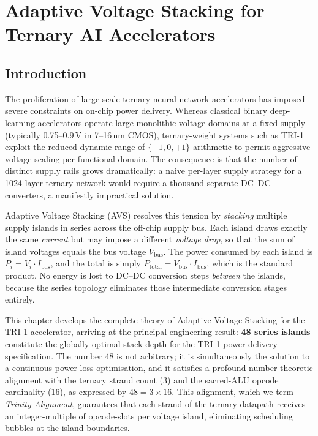 %

\chapter{Adaptive Voltage Stacking for Ternary AI Accelerators}
\label{ch:avs}

\section{Introduction}
\label{sec:avs_intro}

The proliferation of large-scale ternary neural-network accelerators
has imposed severe constraints on on-chip power delivery.  Whereas
classical binary deep-learning accelerators operate large monolithic
voltage domains at a fixed supply (typically 0.75--0.9\,V in 7--16\,nm
CMOS), ternary-weight systems such as TRI-1 exploit the reduced dynamic
range of $\{-1, 0, +1\}$ arithmetic to permit aggressive voltage scaling
per functional domain.  The consequence is that the number of distinct
supply rails grows dramatically: a naive per-layer supply strategy for a
1024-layer ternary network would require a thousand separate DC--DC
converters, a manifestly impractical solution.

Adaptive Voltage Stacking (AVS) resolves this tension by \emph{stacking}
multiple supply islands in series across the off-chip supply bus.  Each
island draws exactly the same \emph{current} but may impose a different
\emph{voltage drop}, so that the sum of island voltages equals the bus
voltage \(V_{\mathrm{bus}}\).  The power consumed by each island is
\(P_i = V_i \cdot I_{\mathrm{bus}}\), and the total is simply
\(P_{\mathrm{total}} = V_{\mathrm{bus}} \cdot I_{\mathrm{bus}}\), which
is the standard product.  No energy is lost to DC--DC conversion steps
\emph{between} the islands, because the series topology eliminates those
intermediate conversion stages entirely.

This chapter develops the complete theory of Adaptive Voltage Stacking
for the TRI-1 accelerator, arriving at the principal engineering result:
\textbf{48 series islands} constitute the globally optimal stack depth
for the TRI-1 power-delivery specification.  The number 48 is not
arbitrary; it is simultaneously the solution to a continuous power-loss
optimisation, and it satisfies a profound number-theoretic alignment
with the ternary strand count (3) and the sacred-ALU opcode cardinality
(16), as expressed by \(48 = 3 \times 16\).  This alignment, which we
term \emph{Trinity Alignment}, guarantees that each strand of the
ternary datapath receives an integer-multiple of opcode-slots per
voltage island, eliminating scheduling bubbles at the island boundaries.

